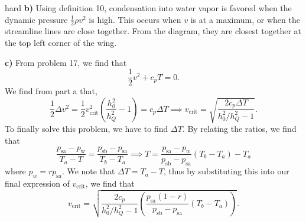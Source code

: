 \begin{solution}{hard}
\noindent \textbf{b)} Using definition 10, condensation into water vapor is favored when the dynamic pressure $\frac{1}{2}\rho v^2$ is high. This occurs when $v$ is at a maximum, or when the streamline lines are close together. From the diagram, they are closest together at the top left corner of the wing.
\vspace{3mm}

\noindent \textbf{c)} From problem 17, we find that 
\[\frac{1}{2}v^2 + c_p T = 0.\]
We find from part a that,
\[\frac{1}{2}\Delta v^2 = \frac{1}{2}v_{\text{crit}}^2 \left(\frac{h_0^2}{h_Q^2} - 1\right) = c_p \Delta T\implies v_{\text{crit}} = \sqrt{\frac{2c_p\Delta T}{h_0^2/h_Q^2 - 1}}.\]
To finally solve this problem, we have to find $\Delta T$. By relating the ratios, we find that 
\[\frac{p_{\text{sa}} - p_{\text{w}}}{T_a - T} = \frac{p_{\text{sb}} - p_{\text{sa}}}{T_b - T_a}\implies T = \frac{p_{\text{sa}} - p_w}{p_{\text{sb}} - p_{\text{sa}}} (T_b - T_a) - T_a\]
where $p_w = rp_{\text{sa}}.$ We note that $\Delta T = T_a - T$, thus by substituting this into our final expression of $v_{\text{crit}}$, we find that 
\[v_{\text{crit}} = \boxed{\sqrt{\frac{2c_p}{h_0^2/h_Q^2 - 1}\left(\frac{p_{\text{sa}}(1 - r)}{p_{\text{sb}} - p_{\text{sa}}} (T_b - T_a)\right)}}.\]

\end{solution}